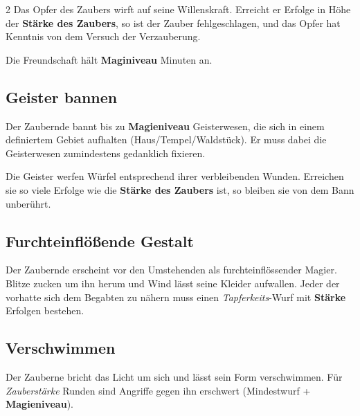 \begin{multicols*}{2}
Das Opfer des Zaubers wirft auf seine Willenskraft. Erreicht er Erfolge in Höhe der \textbf{Stärke des Zaubers}, so ist der Zauber fehlgeschlagen, und das Opfer hat Kenntnis von dem Versuch der Verzauberung.

Die Freundschaft hält \textbf{Maginiveau} Minuten an.



\subsection{Geister bannen}

Der Zaubernde bannt  bis zu \textbf{Magieniveau} Geisterwesen, die sich in einem definiertem Gebiet aufhalten (Haus/Tempel/Waldstück). Er muss dabei die Geisterwesen zumindestens gedanklich fixieren.

Die Geister werfen Würfel entsprechend ihrer verbleibenden Wunden. Erreichen sie so viele Erfolge wie die \textbf{Stärke des Zaubers} ist, so bleiben sie von dem Bann unberührt.



\subsection{Furchteinflößende Gestalt}

Der Zaubernde erscheint vor den Umstehenden als furchteinflössender Magier. Blitze zucken um ihn herum und Wind lässt seine Kleider aufwallen. Jeder der vorhatte sich dem Begabten zu nähern muss einen \textit{Tapferkeits}-Wurf mit \textbf{Stärke} Erfolgen bestehen.



\subsection{Verschwimmen}

Der Zauberne bricht das Licht um sich und lässt sein Form verschwimmen. Für \textit{Zauberstärke} Runden sind Angriffe gegen ihn erschwert (Mindestwurf + \textbf{Magieniveau}).




\end{multicols*}
